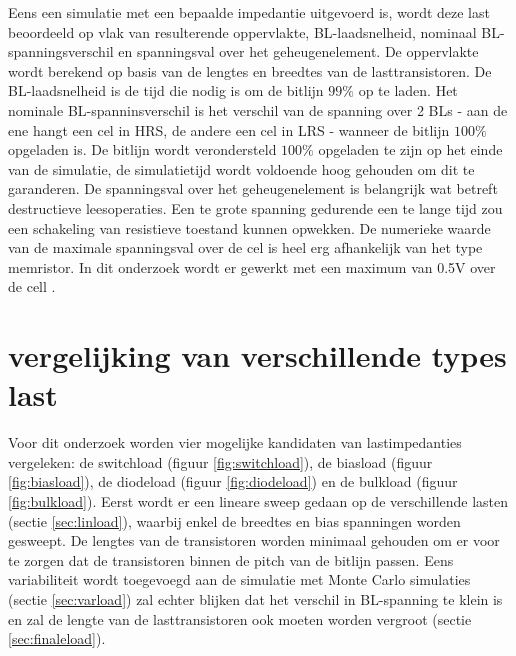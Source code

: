 Eens een simulatie met een bepaalde impedantie uitgevoerd is, wordt deze last beoordeeld op vlak van resulterende oppervlakte, BL-laadsnelheid, nominaal BL-spanningsverschil en spanningsval over het geheugenelement. De oppervlakte wordt berekend op basis van de lengtes en breedtes van de lasttransistoren. De BL-laadsnelheid is de tijd die nodig is om de bitlijn $99\%$ op te laden. Het nominale BL-spanninsverschil is het verschil van de spanning over 2 BLs - aan de ene hangt een cel in HRS, de andere een cel in LRS - wanneer de bitlijn $100\%$ opgeladen is. De bitlijn wordt verondersteld $100\%$ opgeladen te zijn op het einde van de simulatie, de simulatietijd wordt voldoende hoog gehouden om dit te garanderen. De spanningsval over het geheugenelement is belangrijk wat betreft destructieve leesoperaties. Een te grote spanning gedurende een te lange tijd zou een schakeling van resistieve toestand kunnen opwekken. De numerieke waarde van de maximale spanningsval over de cel is heel erg afhankelijk van het type memristor. In dit onderzoek wordt er gewerkt met een maximum van 0.5V over de cell \cite{ppt:model}.

\section{vergelijking van verschillende types last}
Voor dit onderzoek worden vier mogelijke kandidaten van lastimpedanties vergeleken: de switchload (figuur \ref{fig:switchload}), de biasload (figuur \ref{fig:biasload}), de diodeload (figuur \ref{fig:diodeload}) en de bulkload (figuur \ref{fig:bulkload})\cite{bulkload}. Eerst wordt er een lineare sweep gedaan op de verschillende lasten (sectie \ref{sec:linload}), waarbij enkel de breedtes en bias spanningen worden gesweept. De lengtes van de transistoren worden minimaal gehouden om er voor te zorgen dat de transistoren binnen de pitch van de bitlijn passen. Eens variabiliteit wordt toegevoegd aan de simulatie met Monte Carlo simulaties (sectie \ref{sec:varload}) zal echter blijken dat het verschil in BL-spanning te klein is en zal de lengte van de lasttransistoren ook moeten worden vergroot (sectie \ref{sec:finaleload}).


